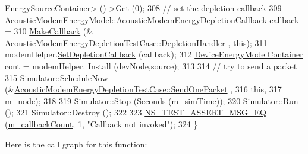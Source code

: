 \begin{DoxyCode}
      \hyperlink{classns3_1_1EnergySourceContainer}{EnergySourceContainer}> ()->Get (0);
308   \textcolor{comment}{// set the depletion callback}
309   \hyperlink{classns3_1_1Callback}{AcousticModemEnergyModel::AcousticModemEnergyDepletionCallback}
       callback =
310     \hyperlink{group__makecallbackmemptr_ga9376283685aa99d204048d6a4b7610a4}{MakeCallback} (&
      \hyperlink{classAcousticModemEnergyDepletionTestCase_a821bfbad5268c94f381b46b3da55c166}{AcousticModemEnergyDepletionTestCase::DepletionHandler}
      , \textcolor{keyword}{this});
311   modemHelper.\hyperlink{classns3_1_1AcousticModemEnergyModelHelper_a9f3e874ddcc7469341aec932dae3813e}{SetDepletionCallback} (callback);
312   \hyperlink{classns3_1_1DeviceEnergyModelContainer}{DeviceEnergyModelContainer} cont = modemHelper.
      \hyperlink{classns3_1_1DeviceEnergyModelHelper_a085a4854e96ff8f314a9ebec93e6c4eb}{Install} (devNode,source);
313 
314   \textcolor{comment}{// try to send a packet}
315   Simulator::ScheduleNow (&\hyperlink{classAcousticModemEnergyDepletionTestCase_a3516e25b430f496c6a3ba2366e08691a}{AcousticModemEnergyDepletionTestCase::SendOnePacket}
      ,
316                           \textcolor{keyword}{this},
317                           \hyperlink{classAcousticModemEnergyDepletionTestCase_aad8287a51fe09423d58935484fb3ac6d}{m\_node});
318 
319   Simulator::Stop (\hyperlink{group__timecivil_ga33c34b816f8ff6628e33d5c8e9713b9e}{Seconds} (\hyperlink{classAcousticModemEnergyDepletionTestCase_ae081c5442fcc0406d5d002c20540e0a5}{m\_simTime}));
320   Simulator::Run ();
321   Simulator::Destroy ();
322 
323   \hyperlink{group__testing_ga2a9d78cffb3db8e867c35fff0b698cf5}{NS\_TEST\_ASSERT\_MSG\_EQ} (\hyperlink{classAcousticModemEnergyDepletionTestCase_aab78b851effc5b78aabd4f82cf0007e2}{m\_callbackCount}, 1, \textcolor{stringliteral}{"Callback not invoked"});
324 \}
\end{DoxyCode}


Here is the call graph for this function\+:


